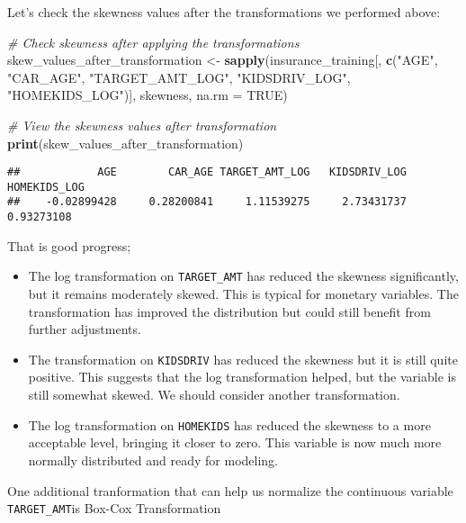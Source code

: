 \documentclass[
]{article}
\newenvironment{Shaded}{\begin{snugshade}}{\end{snugshade}}
\newcommand{\AttributeTok}[1]{\textcolor[rgb]{0.13,0.29,0.53}{#1}}
\newcommand{\CommentTok}[1]{\textcolor[rgb]{0.56,0.35,0.01}{\textit{#1}}}
\newcommand{\ConstantTok}[1]{\textcolor[rgb]{0.56,0.35,0.01}{#1}}
\newcommand{\DecValTok}[1]{\textcolor[rgb]{0.00,0.00,0.81}{#1}}
\newcommand{\FunctionTok}[1]{\textcolor[rgb]{0.13,0.29,0.53}{\textbf{#1}}}
\newcommand{\NormalTok}[1]{#1}
\newcommand{\OtherTok}[1]{\textcolor[rgb]{0.56,0.35,0.01}{#1}}
\newcommand{\SpecialCharTok}[1]{\textcolor[rgb]{0.81,0.36,0.00}{\textbf{#1}}}
\newcommand{\StringTok}[1]{\textcolor[rgb]{0.31,0.60,0.02}{#1}}
\begin{document}
Let's check the skewness values after the transformations we performed
above:

\begin{Shaded}
\begin{Highlighting}[]
\CommentTok{\# Check skewness after applying the transformations}
\NormalTok{skew\_values\_after\_transformation }\OtherTok{\textless{}{-}} \FunctionTok{sapply}\NormalTok{(insurance\_training[, }\FunctionTok{c}\NormalTok{(}\StringTok{"AGE"}\NormalTok{, }\StringTok{"CAR\_AGE"}\NormalTok{, }\StringTok{"TARGET\_AMT\_LOG"}\NormalTok{, }\StringTok{"KIDSDRIV\_LOG"}\NormalTok{, }\StringTok{"HOMEKIDS\_LOG"}\NormalTok{)], skewness, }\AttributeTok{na.rm =} \ConstantTok{TRUE}\NormalTok{)}

\CommentTok{\# View the skewness values after transformation}
\FunctionTok{print}\NormalTok{(skew\_values\_after\_transformation)}
\end{Highlighting}
\end{Shaded}

\begin{verbatim}
##            AGE        CAR_AGE TARGET_AMT_LOG   KIDSDRIV_LOG   HOMEKIDS_LOG 
##    -0.02899428     0.28200841     1.11539275     2.73431737     0.93273108
\end{verbatim}

That is good progress;

\begin{itemize}
\item
  The log transformation on \texttt{TARGET\_AMT} has reduced the
  skewness significantly, but it remains moderately skewed. This is
  typical for monetary variables. The transformation has improved the
  distribution but could still benefit from further adjustments.
\item
  The transformation on \texttt{KIDSDRIV} has reduced the skewness but
  it is still quite positive. This suggests that the log transformation
  helped, but the variable is still somewhat skewed. We should consider
  another transformation.
\item
  The log transformation on \texttt{HOMEKIDS} has reduced the skewness
  to a more acceptable level, bringing it closer to zero. This variable
  is now much more normally distributed and ready for modeling.
\end{itemize}

One additional tranformation that can help us normalize the continuous
variable \texttt{TARGET\_AMT}is Box-Cox Transformation

\begin{Shaded}
\end{Shaded}
\end{document}
